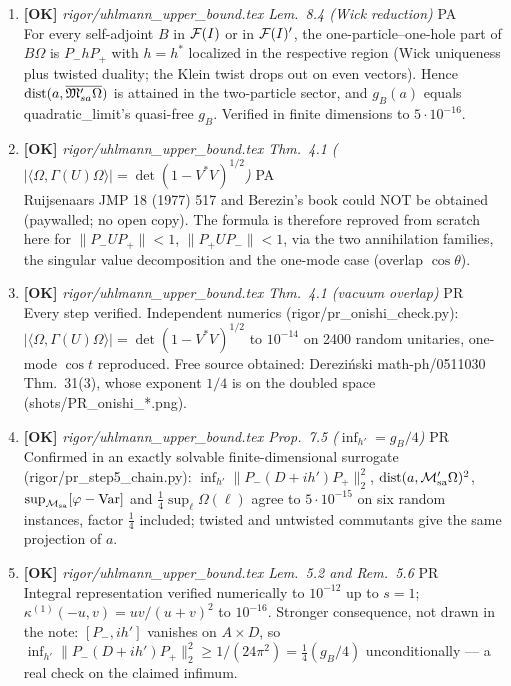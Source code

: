 \documentclass[11pt]{article}
\begin{document}
\begin{enumerate}[leftmargin=1.6em,itemsep=6pt]
\item \textbf{[OK]} \emph{rigor/uhlmann\_upper\_bound.tex Lem.~8.4 (Wick reduction)} \hfill\textsc{PA}\\ For every self-adjoint \(B\) in \(\mathcal F(I)\) or in \(\mathcal F(I)'\), the one-particle--one-hole part of \(B\Omega\) is \(P_-hP_+\) with \(h=h^*\) localized in the respective region (Wick uniqueness plus twisted duality; the Klein twist drops out on even vectors). Hence \(\operatorname{dist}(a,\overline{\mathfrak M'_{sa}\Omega})\) is attained in the two-particle sector, and \(g_B(a)\) equals quadratic\_limit's quasi-free \(g_B\). Verified in finite dimensions to \(5\cdot10^{-16}\).
\item \textbf{[OK]} \emph{rigor/uhlmann\_upper\_bound.tex Thm.~4.1 (\(|\langle\Omega,\Gamma(U)\Omega\rangle|=\det(1-V^*V)^{1/2}\))} \hfill\textsc{PA}\\ Ruijsenaars JMP 18 (1977) 517 and Berezin's book could NOT be obtained (paywalled; no open copy). The formula is therefore reproved from scratch here for \(\lVert P_-UP_+\rVert<1\), \(\lVert P_+UP_-\rVert<1\), via the two annihilation families, the singular value decomposition and the one-mode case (overlap \(\cos\theta\)).
\item \textbf{[OK]} \emph{rigor/uhlmann\_upper\_bound.tex Thm.~4.1 (vacuum overlap)} \hfill\textsc{PR}\\ Every step verified. Independent numerics (rigor/pr\_onishi\_check.py): \(|\langle\Omega,\Gamma(U)\Omega\rangle|=\det(1-V^*V)^{1/2}\) to \(10^{-14}\) on 2400 random unitaries, one-mode \(\cos t\) reproduced. Free source obtained: Derezi\'nski math-ph/0511030 Thm.~31(3), whose exponent \(1/4\) is on the doubled space (shots/PR\_onishi\_*.png).
\item \textbf{[OK]} \emph{rigor/uhlmann\_upper\_bound.tex Prop.~7.5 (\(\inf_{h'}=g_B/4\))} \hfill\textsc{PR}\\ Confirmed in an exactly solvable finite-dimensional surrogate (rigor/pr\_step5\_chain.py): \(\inf_{h'}\|P_-(D+ih')P_+\|_2^2\), \(\operatorname{dist}(a,\mathcal M'_{\rm sa}\Omega)^2\), \(\sup_{\mathcal M_{\rm sa}}[\varphi-\operatorname{Var}]\) and \(\tfrac14\sup_\ell\Omega(\ell)\) agree to \(5\cdot10^{-15}\) on six random instances, factor \(\tfrac14\) included; twisted and untwisted commutants give the same projection of \(a\).
\item \textbf{[OK]} \emph{rigor/uhlmann\_upper\_bound.tex Lem.~5.2 and Rem.~5.6} \hfill\textsc{PR}\\ Integral representation verified numerically to \(10^{-12}\) up to \(s=1\); \(\kappa^{(1)}(-u,v)=uv/(u+v)^2\) to \(10^{-16}\). Stronger consequence, not drawn in the note: \([P_-,ih']\) vanishes on \(A\times D\), so \(\inf_{h'}\|P_-(D+ih')P_+\|_2^2\ge1/(24\pi^2)=\tfrac14(g_B/4)\) unconditionally --- a real check on the claimed infimum.

\end{enumerate}
\end{document}
